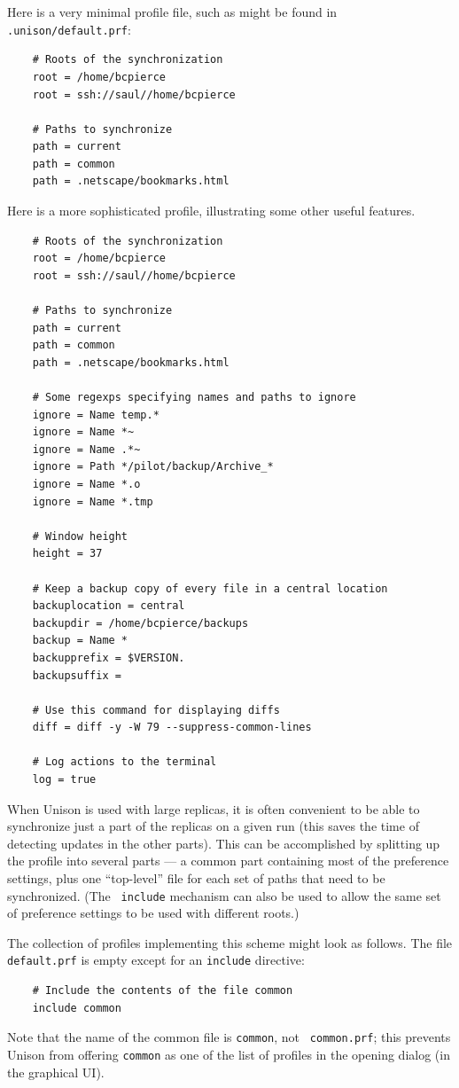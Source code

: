 \documentclass{article}
\begin{document}
Here is a very minimal profile file, such as might be found in {\tt
  .unison/default.prf}:
\begin{verbatim}
    # Roots of the synchronization
    root = /home/bcpierce
    root = ssh://saul//home/bcpierce

    # Paths to synchronize
    path = current
    path = common
    path = .netscape/bookmarks.html
\end{verbatim}


Here is a more sophisticated profile, illustrating some other useful
features.
\begin{verbatim}
    # Roots of the synchronization
    root = /home/bcpierce
    root = ssh://saul//home/bcpierce

    # Paths to synchronize
    path = current
    path = common
    path = .netscape/bookmarks.html

    # Some regexps specifying names and paths to ignore
    ignore = Name temp.*
    ignore = Name *~
    ignore = Name .*~
    ignore = Path */pilot/backup/Archive_*
    ignore = Name *.o
    ignore = Name *.tmp

    # Window height
    height = 37

    # Keep a backup copy of every file in a central location
    backuplocation = central
    backupdir = /home/bcpierce/backups
    backup = Name *
    backupprefix = $VERSION.
    backupsuffix =

    # Use this command for displaying diffs
    diff = diff -y -W 79 --suppress-common-lines

    # Log actions to the terminal
    log = true
\end{verbatim}


When Unison is used with large replicas, it is often convenient to be
able to synchronize just a part of the replicas on a given run (this
saves the time of detecting updates in the other parts).  This can be
accomplished by splitting up the profile into several parts --- a common
part containing most of the preference settings, plus one ``top-level''
file for each set of paths that need to be synchronized.  (The {\tt
  include} mechanism can also be used to allow the same set of preference
settings to be used with different roots.)

The collection
of profiles implementing this scheme might look as follows.
%
The file {\tt default.prf} is empty except for an {\tt include}
directive:
\begin{verbatim}
    # Include the contents of the file common
    include common
\end{verbatim}
Note that the name of the common file is {\tt common}, not {\tt
  common.prf}; this prevents Unison from offering {\tt common} as one of
the list of profiles in the opening dialog (in the graphical UI).
\end{document}
